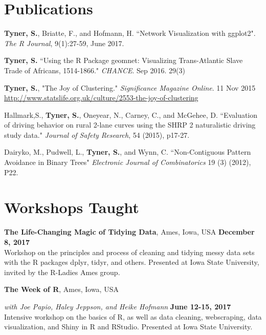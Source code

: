 \documentclass[margin,line]{res}
\begin{document}
\begin{resume}
\section{\sc Publications}

\begin{etaremune}[start=5, itemindent = -1.25em]

\item \textbf{Tyner, S.}, Briatte, F.,  and Hofmann, H. ``Network Visualization with ggplot2". {\em The R Journal}, 9(1):27-59, June 2017.

\item \textbf{Tyner, S.} ``Using the R Package geomnet: Visualizing Trans-Atlantic Slave Trade of Africans, 1514-1866." \textit{CHANCE}.  Sep 2016. 29(3)

\item \textbf{Tyner, S.}, "The Joy of Clustering." \textit{Significance Magazine Online}. 11 Nov 2015 \url{http://www.statslife.org.uk/culture/2553-the-joy-of-clustering}

\item Hallmark,S., \textbf{Tyner, S.},  Oneyear, N., Carney, C., and McGehee, D. ``Evaluation of driving behavior on rural 2-lane curves using the SHRP 2 naturalistic driving study data." \textit{Journal of Safety Research}, 54 (2015), p17-27.

\item Dairyko, M., Pudwell, L., \textbf{Tyner, S.}, and Wynn, C.  ``Non-Contiguous Pattern Avoidance in Binary Trees" \textit{Electronic Journal of Combinatorics} 19 (3) (2012), P22.

\end{etaremune}


\section{\sc Workshops Taught}

{\bf The Life-Changing Magic of Tidying Data}, Ames, Iowa, USA \hfill {\bf December 8, 2017}\\
Workshop on the principles and process of cleaning and tidying messy data sets with the R packages dplyr, tidyr, and others. Presented at Iowa State University, invited by the R-Ladies Ames group.


{\bf The Week of R}, Ames, Iowa, USA

\vspace{-.4cm}

{\em with Joe Papio, Haley Jeppson, and Heike Hofmann} \hfill {\bf June 12-15, 2017}\\
Intensive workshop on the basics of R, as well as data cleaning, webscraping, data visualization, and Shiny in R and RStudio. Presented at Iowa State University.


\end{resume}
\end{document}
